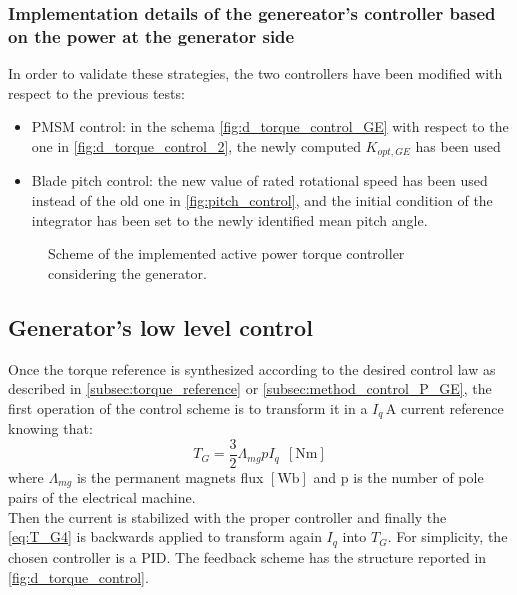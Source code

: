 \subsubsection[Implementation details]{Implementation details of the genereator's controller based on the power at the generator side}
In order to validate these strategies, the two controllers have been modified with respect to the previous tests:
\begin{itemize}
  \item PMSM control: in the schema \autoref{fig:d_torque_control_GE} with respect to the one in \autoref{fig:d_torque_control_2}, the newly computed  $K_{opt,GE}$ has been used%
  \item Blade pitch control: the new value of rated rotational speed has been used instead of the old one in \autoref{fig:pitch_control}, and the initial condition of the integrator has been set to the newly identified mean pitch angle.
\end{itemize}

\begin{figure}[H]
  \centering
  
  \caption{Scheme of the implemented active power torque controller considering the generator.}
  \label{fig:d_torque_control_GE}
\end{figure}

\subsection{Generator's low level control}\label{subsec:generator_low_level-control}
Once the torque reference is synthesized according to the desired control law as described in \autoref{subsec:torque_reference} or \autoref{subsec:method_control_P_GE}, the first operation of the control scheme is to transform it in a $I_q \, \si{\ampere}$ current reference knowing that:
\begin{equation}
    T_G = \frac{3}{2}\Lambda_{mg} p I_q \ \ \left[\si{\newton\meter}\right]
    \label{eq:T_G4}
\end{equation}
where $\Lambda_{mg}$ is the permanent magnets flux $\left[\si{\weber}\right]$ and p is the number of pole pairs of the electrical machine.\\
Then the current is stabilized with the proper controller and finally the \autoref{eq:T_G4} is backwards applied to transform again $I_q$ into $T_G$. For simplicity, the chosen controller is a \acrfull{PID}. The feedback scheme has the structure reported in \autoref{fig:d_torque_control}.

